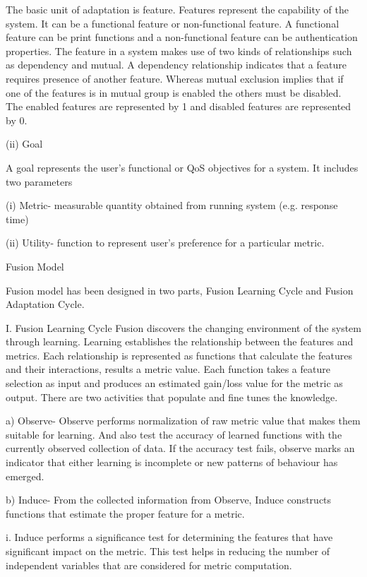 \begin{compactitem}
The basic unit of adaptation is feature. Features represent the capability of the system. It can be a functional feature or non-functional feature. A functional feature can be print functions and a non-functional feature can be authentication properties. The feature in a system makes use of two kinds of relationships such as dependency and mutual. A dependency relationship indicates that a feature requires presence of another feature. Whereas mutual exclusion implies that if one of the features is in mutual group is enabled the others must be disabled. The enabled features are represented by 1 and disabled features are represented by 0. 

(ii) Goal

A goal represents the user’s functional or QoS objectives for a system. It includes two parameters

(i) Metric- measurable quantity obtained from running system (e.g. response time) 

(ii) Utility- function to represent user’s preference for a particular metric.

Fusion Model

Fusion model has been designed in two parts, Fusion Learning Cycle and Fusion Adaptation Cycle.

I. Fusion Learning Cycle
Fusion discovers the changing environment of the system through learning. Learning establishes the 
relationship between the features and metrics. Each relationship is represented as functions that 
calculate the features and their interactions, results a metric value. Each function takes a feature selection as input and produces an estimated gain/loss value for the metric as output. There are two activities that populate and fine tunes the knowledge.

a) Observe- Observe performs normalization of raw metric value that makes them suitable for 
learning. And also test the accuracy of learned functions with the currently observed 
collection of data. If the accuracy test fails, observe marks an indicator that either learning is 
incomplete or new patterns of behaviour has emerged.

b) Induce- From the collected information from Observe, Induce constructs functions that 
estimate the proper feature for a metric. 

i. Induce performs a significance test for determining the features that have significant 
impact on the metric. This test helps in reducing the number of independent variables 
that are considered for metric computation.


\end{compactitem}
